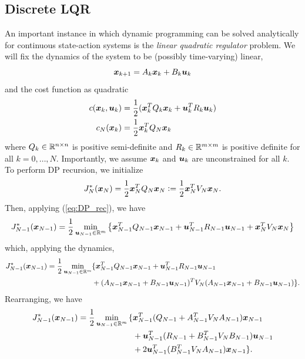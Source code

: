 \subsection{Discrete LQR}
\label{sec:disrete_LQR}
An important instance in which dynamic programming can be solved analytically for continuous state-action systems is the \textit{linear quadratic regulator} problem. We will fix the dynamics of the system to be (possibly time-varying) linear, 
\begin{equation}
    \bm{x}_{k+1} = A_k \bm{x}_k + B_k \bm{u}_k
\end{equation}
and the cost function as quadratic
\begin{align}
    c(\bm{x}_k, \bm{u}_k) &= \frac{1}{2} ( \bm{x}_k^T Q_k \bm{x}_k + \bm{u}_k^T R_k \bm{u}_k )\\
    c_N(\bm{x}_k) &= \frac{1}{2} \bm{x}_k^T Q_N \bm{x}_k
\end{align}
where $Q_k \in \mathbb{R}^{n \times n}$ is positive semi-definite and $R_k \in \mathbb{R}^{m \times m}$ is positive definite for all $k = 0, \ldots, N$. Importantly, we assume $\bm{x}_k$ and $\bm{u}_k$ are unconstrained for all $k$. To perform DP recursion, we initialize 
\begin{equation}
    J_N^*(\bm{x}_N) = \frac{1}{2} \bm{x}_N^T Q_N \bm{x}_N \vcentcolon= \frac{1}{2} \bm{x}_N^T V_N \bm{x}_N.
\end{equation}
Then, applying (\ref{eq:DP_rec}), we have
\begin{equation}
    J_{N-1}^*(\bm{x}_{N-1}) = \frac{1}{2} \min_{\bm{u}_{N-1} \in \mathbb{R}^m} \left\{ \bm{x}_{N-1}^T Q_{N-1} \bm{x}_{N-1} + \bm{u}_{N-1}^T R_{N-1} \bm{u}_{N-1} + \bm{x}_N^T V_N \bm{x}_N \right\}
\end{equation}
which, applying the dynamics,
\begin{align}
\label{eq:LQR_rec_cost}
    J_{N-1}^*(\bm{x}_{N-1}) = \frac{1}{2} \min_{\bm{u}_{N-1} \in \mathbb{R}^m} & {\large\{} \bm{x}_{N-1}^T Q_{N-1} \bm{x}_{N-1} + \bm{u}_{N-1}^T R_{N-1} \bm{u}_{N-1}\\
    &+ (A_{N-1} \bm{x}_{N-1} + B_{N-1} \bm{u}_{N-1})^T V_N (A_{N-1} \bm{x}_{N-1} + B_{N-1} \bm{u}_{N-1}) {\large\}}. \nonumber
\end{align}
Rearranging, we have
\begin{align}
    J_{N-1}^*(\bm{x}_{N-1}) = \frac{1}{2} \min_{\bm{u}_{N-1} \in \mathbb{R}^m} {\large\{}
    & \bm{x}_{N-1}^T (Q_{N-1} + A_{N-1}^T V_N A_{N-1}) \bm{x}_{N-1}\\ \nonumber
    & + \bm{u}_{N-1}^T (R_{N-1} + B_{N-1}^T V_N B_{N-1}) \bm{u}_{N-1}\\\nonumber
    & + 2 \bm{u}_{N-1}^T (B_{N-1}^T V_N A_{N-1}) \bm{x}_{N-1} \nonumber
    {\large\}}.
\end{align}
